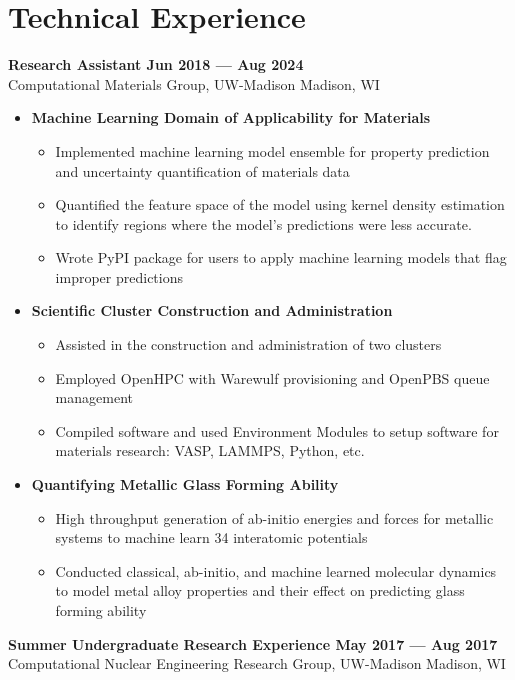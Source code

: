 \section{Technical Experience}

\textbf{Research Assistant \hfill Jun 2018 --- Aug 2024}\\
Computational Materials Group, UW-Madison \hfill Madison, WI

\begin{itemize}
\item \textbf{Machine Learning Domain of Applicability for Materials}
    \begin{itemize}
        \item Implemented machine learning model ensemble for property prediction and uncertainty quantification of materials data
        \item Quantified the feature space of the model using kernel density estimation to identify regions where the model's predictions were less accurate.
        \item Wrote PyPI package for users to apply machine learning models that flag improper predictions
    \end{itemize}
\item \textbf{Scientific Cluster Construction and Administration}
    \begin{itemize}
        \item Assisted in the construction and administration of two clusters
        \item Employed OpenHPC with Warewulf provisioning and OpenPBS queue management
        \item Compiled software and used Environment Modules to setup software for materials research: VASP, LAMMPS, Python, etc.
    \end{itemize}
\item \textbf{Quantifying Metallic Glass Forming Ability}
    \begin{itemize}
        \item High throughput generation of ab-initio energies and forces for metallic systems to machine learn 34 interatomic potentials
        \item Conducted classical, ab-initio, and machine learned molecular dynamics to model metal alloy properties and their effect on predicting glass forming ability
    \end{itemize}
\end{itemize}

\textbf{Summer Undergraduate Research Experience \hfill May 2017 --- Aug 2017}\\
Computational Nuclear Engineering Research Group, UW-Madison \hfill Madison, WI

